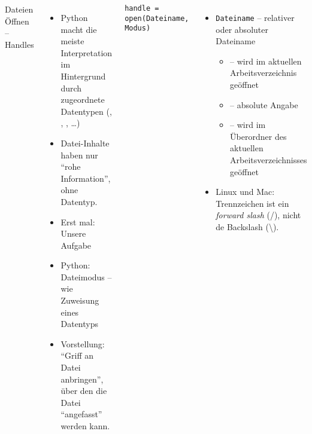 \begin{frame}[fragile]
%
\begin{columns}[T]
\begin{Large}
	{Dateien Öffnen -- Handles}
	\vspace{6pt}
\end{Large}
\begin{itemize}
\item Python macht die meiste Interpretation im Hintergrund durch zugeordnete Datentypen (, , , \ldots)
\item Datei-Inhalte haben nur \enquote{rohe Information}, ohne Datentyp.
\item[\Thus] Erst mal: Unsere Aufgabe
\item Python: Dateimodus -- wie Zuweisung eines Datentyps
\item Vorstellung: \enquote{Griff an Datei anbringen}, über den die Datei \enquote{angefasst} werden kann.
\end{itemize}
%
\begin{codebox}
\begin{verbatim}
handle = open(Dateiname, Modus)
\end{verbatim}
\end{codebox}
%
\begin{itemize}
\item \texttt{Dateiname} -- relativer oder absoluter Dateiname
	\begin{itemize}
	\item {} -- wird im aktuellen Arbeitsverzeichnis geöffnet
	\item {} -- absolute Angabe
	\item {} -- wird im Überordner des aktuellen Arbeitsverzeichnisses geöffnet
	\end{itemize}
\item Linux und Mac: Trennzeichen ist ein \emph{forward slash} (/), nicht de Backslash (\textbackslash).
\end{itemize}
\end{columns}
%
\end{frame}


